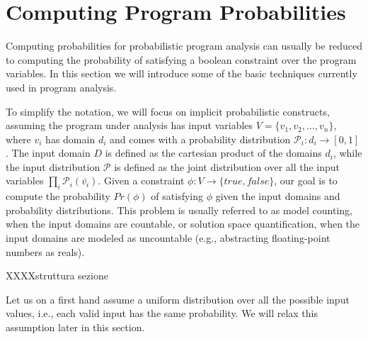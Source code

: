 \section{Computing Program Probabilities}
\label{sec:computingprobabilities}





Computing probabilities for probabilistic program analysis can usually be reduced to computing the probability of satisfying a boolean constraint over the program variables. In this section we will introduce some of the basic techniques currently used in program analysis. 

To simplify the notation, we will focus on implicit probabilistic constructs, assuming the program under analysis has input variables $V=\{v_1, v_2, \dots, v_n\}$, where $v_i$ has domain $d_i$ and comes with a probability distribution $\mathcal{P}_i: d_i \to [0, 1]$. The input domain $D$ is defined as the cartesian product of the domains $d_i$, while the input distribution $\mathcal{P}$ is defined as the joint distribution over all the input variables $\prod_i \mathcal{P}_i(\bar{v_i})$. Given a constraint $\phi: V \to \{true, false\}$, our goal is to compute the probability $Pr(\phi)$ of satisfying $\phi$ given the input domains and probability distributions. This problem is usually referred to as model counting, when the input domains are countable, or solution space quantification, when the input domains are modeled as uncountable (e.g., abstracting floating-point numbers as reals).

XXXXstruttura sezione

Let us on a first hand assume a uniform distribution over all the possible input values, i.e., each valid input has the same probability. We will relax this assumption later in this section. 

